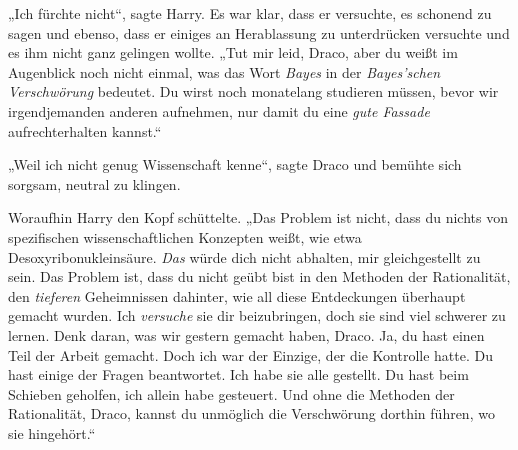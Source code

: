 „Ich fürchte nicht“, sagte Harry. Es war klar, dass er versuchte, es schonend zu sagen und ebenso, dass er einiges an Herablassung zu unterdrücken versuchte und es ihm nicht ganz gelingen wollte.
„Tut mir leid, Draco, aber du weißt im Augenblick noch nicht einmal, was das Wort \emph{Bayes} in der \emph{Bayes’schen Verschwörung} bedeutet. Du wirst noch monatelang studieren müssen, bevor wir irgendjemanden anderen aufnehmen, nur damit du eine \emph{gute Fassade} aufrechterhalten kannst.“

„Weil ich nicht genug Wissenschaft kenne“, sagte Draco und bemühte sich sorgsam, neutral zu klingen.

Woraufhin Harry den Kopf schüttelte.
„Das Problem ist nicht, dass du nichts von spezifischen wissenschaftlichen Konzepten weißt, wie etwa Desoxyribonukleinsäure. \emph{Das} würde dich nicht abhalten, mir gleichgestellt zu sein. Das Problem ist, dass du nicht geübt bist in den Methoden der Rationalität, den \emph{tieferen} Geheimnissen dahinter, wie all diese Entdeckungen überhaupt gemacht wurden. Ich \emph{versuche} sie dir beizubringen, doch sie sind viel schwerer zu lernen. Denk daran, was wir gestern gemacht haben, Draco. Ja, du hast einen Teil der Arbeit gemacht. Doch ich war der Einzige, der die Kontrolle hatte. Du hast einige der Fragen beantwortet. Ich habe sie alle gestellt. Du hast beim Schieben geholfen, ich allein habe gesteuert. Und ohne die Methoden der Rationalität, Draco, kannst du unmöglich die Verschwörung dorthin führen, wo sie hingehört.“

